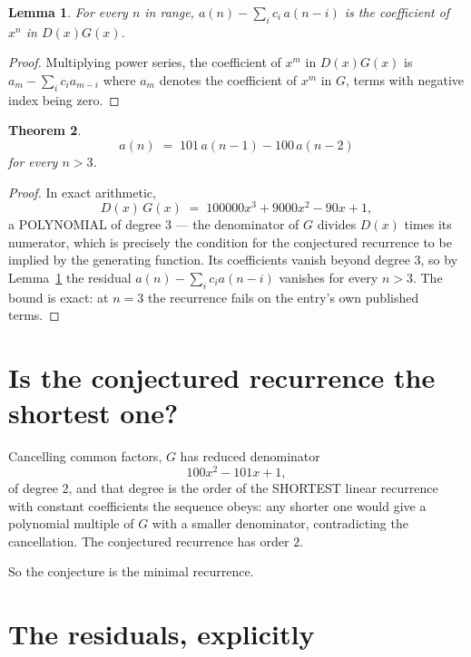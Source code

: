 \documentclass[11pt,a4paper]{article}
\theoremstyle{plain}
\newtheorem{theorem}{Theorem}
\newtheorem{lemma}[theorem]{Lemma}
\theoremstyle{definition}
\begin{document}
\begin{lemma}\label{lem:key}
For every $n$ in range, $a(n)-\sum_i c_i\,a(n-i)$ is the coefficient of $x^{n}$ in
$D(x)G(x)$.
\end{lemma}

\begin{proof}
Multiplying power series, the coefficient of $x^{m}$ in $D(x)G(x)$ is
$a_m-\sum_i c_i a_{m-i}$ where $a_m$ denotes the coefficient of $x^{m}$ in $G$, terms with
negative index being zero.
\end{proof}

\begin{theorem}
\[
a(n)\;=\;101\,a(n-1) - 100\,a(n-2)
\]
for every $n>3$.
\end{theorem}

\begin{proof}
In exact arithmetic,
\[
D(x)\,G(x)\;=\;100000 x^{3} + 9000 x^{2} - 90 x + 1,
\]
a POLYNOMIAL of degree $3$ --- the denominator of $G$ divides $D(x)$ times its numerator,
which is precisely the condition for the conjectured recurrence to be implied by the
generating function. Its coefficients vanish beyond degree $3$, so by
Lemma~\ref{lem:key} the residual $a(n)-\sum_ic_ia(n-i)$ vanishes for every
$n>3$. The bound is exact: at $n=3$ the recurrence fails on the entry's own published terms.
\end{proof}

\section{Is the conjectured recurrence the shortest one?}

Cancelling common factors, $G$ has reduced denominator
\[
100 x^{2} - 101 x + 1,
\]
of degree $2$, and that degree is the order of the SHORTEST linear recurrence with
constant coefficients the sequence obeys: any shorter one would give a polynomial multiple of
$G$ with a smaller denominator, contradicting the cancellation. The conjectured recurrence has
order $2$.

So the conjecture is the minimal recurrence.

\section{The residuals, explicitly}
\end{document}

